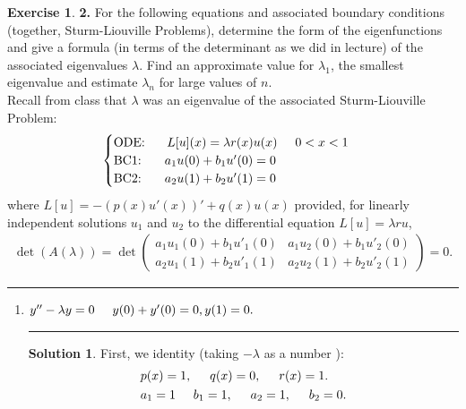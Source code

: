 \documentclass{article}
\theoremstyle{definition}
\newtheorem*{exer*}{Exercise}
\newtheorem*{sln*}{Solution}
\begin{document}
\begin{exer*}\textbf{2.}
	For the following equations and associated boundary conditions (together, Sturm-Liouville Problems),
	determine the form of the eigenfunctions and give a formula (in terms of the determinant as we did in lecture) of
	the associated eigenvalues $\lambda$. Find an approximate value for $\lambda_1$, the smallest eigenvalue and estimate $\lambda_n$ for large
	values of $n$.\\
	
	 Recall from class that $\lambda$ was an eigenvalue of the associated Sturm-Liouville Problem:
	 \begin{align*}
	 \begin{cases}
	 \text{ODE: }\hspace{0.5cm} L[u](x) = \lambda r(x)u(x)\hspace{0.5cm} 0<x<1\\
	 \text{BC1: }\hspace{0.5cm} a_1u(0) + b_1 u'(0) = 0\\
	 \text{BC2: }\hspace{0.5cm} a_2u(1) + b_2u'(1) = 0
	 \end{cases}
	 \end{align*}
	 where $L[u] = -(p(x)u'(x))' + q(x)u(x)$ provided, for linearly independent solutions $u_1$ and $u_2$ to the differential
	 equation $L[u] = \lambda ru$,
	 \begin{align*}
	 \det(A(\lambda)) = \det\begin{pmatrix}
	 a_1u_1(0) + b_1 u'_1(0) & a_1u_2(0) + b_1 u'_2(0)\\
	 a_2u_1(1) + b_2 u'_1(1) & a_2u_2(1) + b_2 u'_2(1)
	 \end{pmatrix} = 0.
	 \end{align*}
	 
	\noindent\rule{\textwidth}{0.5pt}
	 \begin{enumerate}
	 	\item $y'' - \lambda y = 0\hspace{0.5cm} y(0) + y'(0) = 0, y(1) = 0.$\\
	 		\noindent\rule{\textwidth}{0.5pt}
	 	
	 	\begin{sln*}
	 		First, we identity (taking $-\lambda$ as a number ):
	 		\begin{align*}
	 		&p(x) = 1,\hspace{0.5cm} q(x) = 0,\hspace{0.5cm} r(x) = 1.\\
	 		&a_1 = 1\hspace{0.5cm} b_1 = 1,\hspace{0.5cm}a_2 = 1,\hspace{0.5cm} b_2 = 0.
	 		\end{align*}
	 		

\end{sln*}
\end{enumerate}
\end{exer*}
\end{document}
